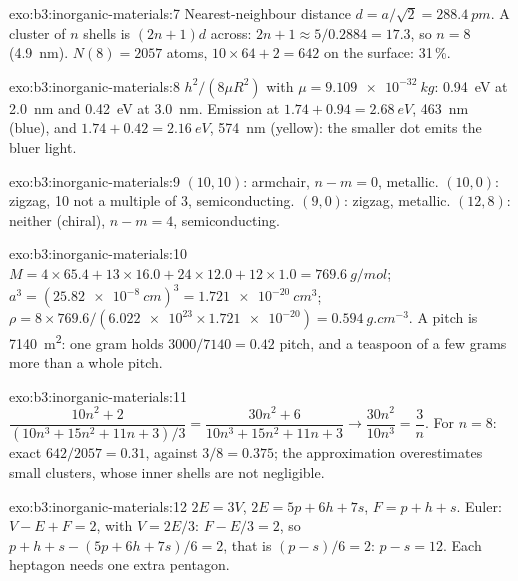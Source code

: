 \begin{solution}{exo:b3:inorganic-materials:7}
Nearest-neighbour distance $d = a/\sqrt2 = \qty{288.4}{pm}$. A cluster of $n$ shells is $(2n + 1)d$ across:
$2n + 1 \approx 5/0.2884 = 17.3$, so $n = 8$ (\qty{4.9}{nm}). $N(8) = 2057$ atoms, $10 \times 64 + 2 = 642$ on the surface:
31\,\%.
\end{solution}

\begin{solution}{exo:b3:inorganic-materials:8}
$h^2/(8\mu R^2)$ with $\mu = \qty{9.109e-32}{kg}$: \qty{0.94}{eV} at \qty{2.0}{nm} and \qty{0.42}{eV} at \qty{3.0}{nm}. Emission at
$1.74 + 0.94 = \qty{2.68}{eV}$, \qty{463}{nm} (blue), and $1.74 + 0.42 = \qty{2.16}{eV}$, \qty{574}{nm} (yellow): the smaller dot
emits the bluer light.
\end{solution}

\begin{solution}{exo:b3:inorganic-materials:9}
$(10, 10)$: armchair, $n - m = 0$, metallic. $(10, 0)$: zigzag, 10 not a multiple of 3, semiconducting.
$(9, 0)$: zigzag, metallic. $(12, 8)$: neither (chiral), $n - m = 4$, semiconducting.
\end{solution}

\begin{solution}{exo:b3:inorganic-materials:10}
$M = 4 \times 65.4 + 13 \times 16.0 + 24 \times 12.0 + 12 \times 1.0 = \qty{769.6}{g/mol}$; $a^3 = (\qty{25.82e-8}{cm})^3 = \qty{1.721e-20}{cm^3}$;
$\rho = 8 \times 769.6/(\num{6.022e23} \times \num{1.721e-20}) = \qty{0.594}{g.cm^{-3}}$. A pitch is \qty{7140}{m^2}: one gram holds
$3000/7140 = 0.42$ pitch, and a teaspoon of a few grams more than a whole pitch.
\end{solution}

\begin{solution}{exo:b3:inorganic-materials:11}
$\dfrac{10n^2 + 2}{(10n^3 + 15n^2 + 11n + 3)/3} = \dfrac{30n^2 + 6}{10n^3 + 15n^2 + 11n + 3} \to \dfrac{30n^2}{10n^3} = \dfrac3n$. For $n = 8$: exact
$642/2057 = 0.31$, against $3/8 = 0.375$; the approximation overestimates small
clusters, whose inner shells are not negligible.
\end{solution}

\begin{solution}{exo:b3:inorganic-materials:12}
$2E = 3V$, $2E = 5p + 6h + 7s$, $F = p + h + s$. Euler: $V - E + F = 2$, with $V = 2E/3$: $F - E/3 = 2$, so
$p + h + s - (5p + 6h + 7s)/6 = 2$, that is $(p - s)/6 = 2$: $p - s = 12$. Each heptagon needs one extra
pentagon.
\end{solution}

